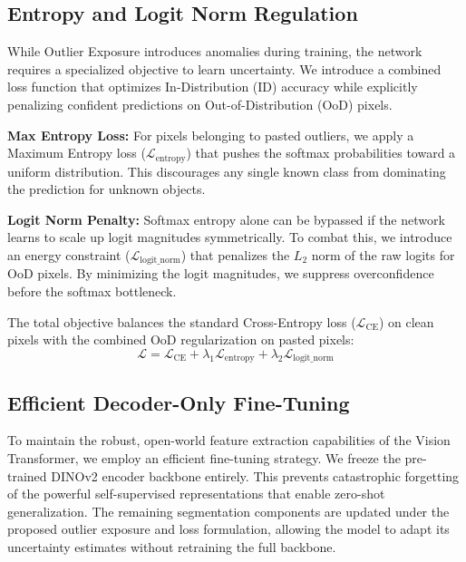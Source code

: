\subsection{Entropy and Logit Norm Regulation}

While Outlier Exposure introduces anomalies during training, the network requires a specialized objective to learn uncertainty. We introduce a combined loss function that optimizes In-Distribution (ID) accuracy while explicitly penalizing confident predictions on Out-of-Distribution (OoD) pixels.

\textbf{Max Entropy Loss:} For pixels belonging to pasted outliers, we apply a Maximum Entropy loss ($\mathcal{L}_{\text{entropy}}$) that pushes the softmax probabilities toward a uniform distribution. This discourages any single known class from dominating the prediction for unknown objects.

\textbf{Logit Norm Penalty:} Softmax entropy alone can be bypassed if the network learns to scale up logit magnitudes symmetrically. To combat this, we introduce an energy constraint ($\mathcal{L}_{\text{logit\_norm}}$) that penalizes the $L_2$ norm of the raw logits for OoD pixels. By minimizing the logit magnitudes, we suppress overconfidence before the softmax bottleneck.

The total objective balances the standard Cross-Entropy loss ($\mathcal{L}_{\text{CE}}$) on clean pixels with the combined OoD regularization on pasted pixels:
\begin{equation}
    \mathcal{L} = \mathcal{L}_{\text{CE}} + \lambda_1 \mathcal{L}_{\text{entropy}} + \lambda_2 \mathcal{L}_{\text{logit\_norm}}
\end{equation}

\subsection{Efficient Decoder-Only Fine-Tuning}

To maintain the robust, open-world feature extraction capabilities of the Vision Transformer, we employ an efficient fine-tuning strategy. We freeze the pre-trained DINOv2 encoder backbone entirely. This prevents catastrophic forgetting of the powerful self-supervised representations that enable zero-shot generalization. The remaining segmentation components are updated under the proposed outlier exposure and loss formulation, allowing the model to adapt its uncertainty estimates without retraining the full backbone.
